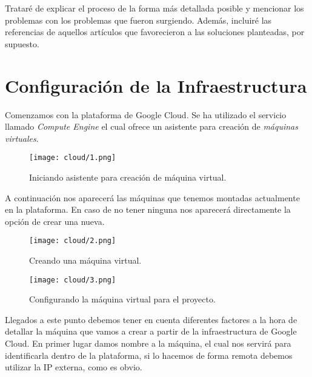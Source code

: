 \documentclass[11pt,fleqn]{book} %
\begin{document}
Trataré de explicar el proceso de la forma más detallada posible y mencionar los problemas con los problemas que fueron surgiendo. Además, incluiré las referencias de aquellos artículos que favorecieron a las soluciones planteadas, por supuesto. \\

\section{Configuración de la Infraestructura}\label{sec:infraestructura}

Comenzamos con la plataforma de Google Cloud. Se ha utilizado el servicio llamado \textit{Compute Engine} el cual ofrece un asistente para creación de \textit{máquinas virtuales}. \\

\begin{figure}[H]
	\centering\texttt{[image: cloud/1.png]}
	\caption{Iniciando asistente para creación de máquina virtual.}
	\label{fig:cloud1} %
\end{figure}

A continuación nos aparecerá las máquinas que tenemos montadas actualmente en la plataforma. En caso de no tener ninguna nos aparecerá directamente la opción de crear una nueva. \\

\begin{figure}[H]
	\centering\texttt{[image: cloud/2.png]}
	\caption{Creando una máquina virtual.}
	\label{fig:cloud2} %
\end{figure}

\begin{figure}[H]
	\centering\texttt{[image: cloud/3.png]}
	\caption{Configurando la máquina virtual para el proyecto.}
	\label{fig:cloud3} %
\end{figure}

Llegados a este punto debemos tener en cuenta diferentes factores a la hora de detallar la máquina que vamos a crear a partir de la infraestructura de Google Cloud. En primer lugar damos nombre a la máquina, el cual nos servirá para identificarla dentro de la plataforma, si lo hacemos de forma remota debemos utilizar la IP externa, como es obvio. \\
\end{document}
